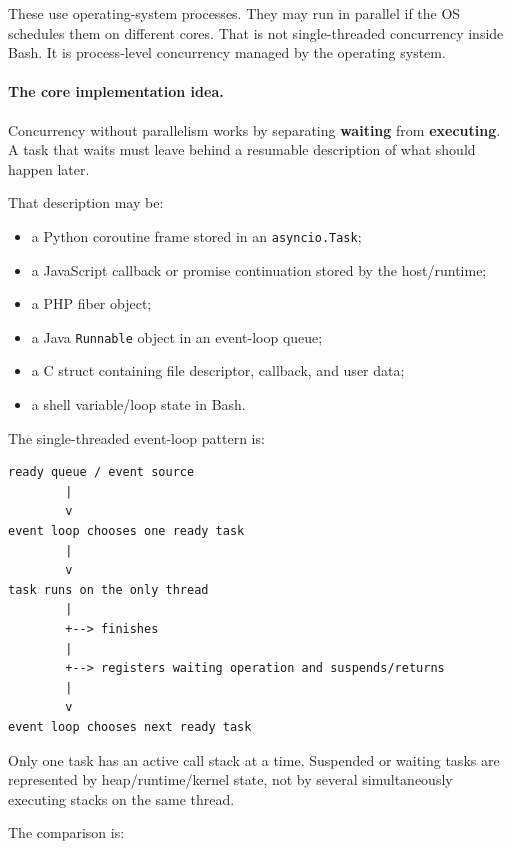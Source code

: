 These use operating-system processes. They may run in parallel if the OS schedules them on different cores. That is not single-threaded concurrency inside Bash. It is process-level concurrency managed by the operating system.

\paragraph{The core implementation idea.}

Concurrency without parallelism works by separating \textbf{waiting} from \textbf{executing}. A task that waits must leave behind a resumable description of what should happen later.

That description may be:

\begin{itemize}
    \item a Python coroutine frame stored in an \texttt{asyncio.Task};
    \item a JavaScript callback or promise continuation stored by the host/runtime;
    \item a PHP fiber object;
    \item a Java \texttt{Runnable} object in an event-loop queue;
    \item a C struct containing file descriptor, callback, and user data;
    \item a shell variable/loop state in Bash.
\end{itemize}

The single-threaded event-loop pattern is:

\begin{verbatim}
ready queue / event source
        |
        v
event loop chooses one ready task
        |
        v
task runs on the only thread
        |
        +--> finishes
        |
        +--> registers waiting operation and suspends/returns
        |
        v
event loop chooses next ready task
\end{verbatim}

Only one task has an active call stack at a time. Suspended or waiting tasks are represented by heap/runtime/kernel state, not by several simultaneously executing stacks on the same thread.

The comparison is:

